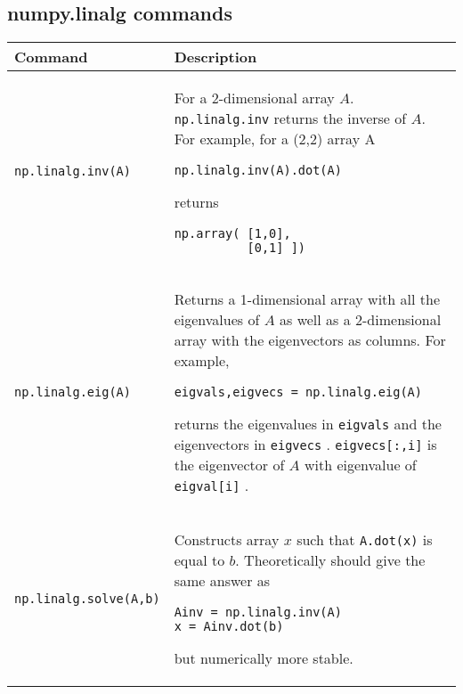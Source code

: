 \documentclass[]{article}
\begin{document}
    \subsection{numpy.linalg commands}
    \begin{longtable}{| m{6cm}  | m{11cm} |}
    \hline
    \textbf{Command} & \textbf{Description} 
    \\\hline
    \texttt{np.linalg.inv(A)} & For a 2-dimensional array $A$.  {\texttt{np.linalg.inv} } returns the inverse of $A$.  For example, for a (2,2) array A
    \begin{verbatim}
np.linalg.inv(A).dot(A)
    \end{verbatim}
    returns
    \begin{verbatim}
np.array( [1,0],
          [0,1] ])
    \end{verbatim}
    \\\hline
    \texttt{np.linalg.eig(A)} & Returns a 1-dimensional array with all the eigenvalues of $A$ as well as a 2-dimensional array with the eigenvectors as columns.  For example,
    \begin{verbatim}
eigvals,eigvecs = np.linalg.eig(A)
    \end{verbatim}
    returns the eigenvalues in {\texttt{eigvals} } and the eigenvectors in  {\texttt{eigvecs} }.  {\texttt{eigvecs[:,i]} } is the eigenvector of $A$  with eigenvalue of {\texttt{eigval[i]} }.
    \\\hline
    \texttt{np.linalg.solve(A,b)} & Constructs array $x$ such that {\texttt{A.dot(x)} } is equal to $b$.  Theoretically should give the same answer as
    \begin{verbatim}
Ainv = np.linalg.inv(A)
x = Ainv.dot(b)
    \end{verbatim} 
    but numerically more stable.
    \\\hline
    \end{longtable}

\end{document}
